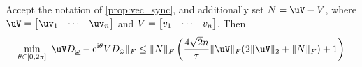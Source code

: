 \begin{corollary}
  Accept the notation of \cref{prop:vec_sync}, and additionally set $N = \uV - V$, where $\uV = \rowmat{\uv}{1}{n}$ and $V = \begin{bmatrix} v_{1} & \cdots & v_{n} \end{bmatrix}$.  Then \begin{equation} \mintheta \norm{\uV D_{\underline{\omega}} - \eit V D_{\hat{\omega}}}_F \le  \norm{N}_F \left(\dfrac{4 \sqrt{2} n}{\tau} \norm{\uV}_F (2 \norm{\uV}_2 + \norm{N}_F) + 1\right) \label{eq:vec_sync_bnd} \end{equation} \label{cor:vec_sync_bnd}
\end{corollary}

